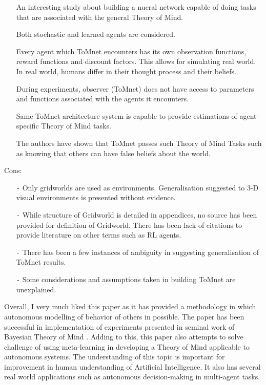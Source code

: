 \documentclass{article}
\begin{document}
\begin{itemize}
	\item[\Plus] An interesting study about building a nueral network capable of doing tasks that are associated with the general Theory of Mind. 
  \item[\Plus] Both stochastic and learned agents are considered.
  \item[\Plus] Every agent which ToMnet encounters has its own observation functions, reward functions and discount factors. This allows for simulating real world. In real world, humans differ in their thought process and their beliefs.
  \item[\Plus] During experiments, observer (ToMnet) does not have access to parameters and functions associated with the agents it encounters.
  \item[\Plus] Same ToMnet architecture system is capable to provide estimations of agent-specific Theory of Mind tasks.
  \item[\Plus] The authors have shown that ToMnet passes such Theory of Mind Tasks such as knowing that others can have false beliefs about the world.
\end{itemize}

\noindent
{Cons:}

\def\Minus{\texttt{-}} %

\begin{itemize}
    \item[\Minus] Only gridworlds are used as environments. Generalisation suggested to 3-D visual environments is presented without evidence. 
	\item[\Minus] While structure of Gridworld is detailed in appendices, no source has been provided for definition of Gridworld. There has been lack of citations to provide literature on other terms such as RL agents.
	\item[\Minus] There has been a few instances of ambiguity in suggesting generalisation of ToMnet results.
	\item[\Minus] Some considerations and assumptions taken in building ToMnet are unexplained. 
\end{itemize}
	

\noindent
Overall, I very much liked this paper as it has provided a methodology in which autonomous modelling of behavior of others in possible. The paper has been successful in implementation of experiments presented in seminal work of Bayesian Theory of Mind \cite{Baker11bayesiantheory} \cite{Baker2017}. Adding to this, this paper also attempts to solve challenge of using meta-learning in developing a Theory of Mind applicable to autonomous systems. The understanding of this topic is important for improvement in human understanding of Artificial Intelligence. It also has several real world applications such as autonomous decision-making in multi-agent tasks.
\\
\end{document}
